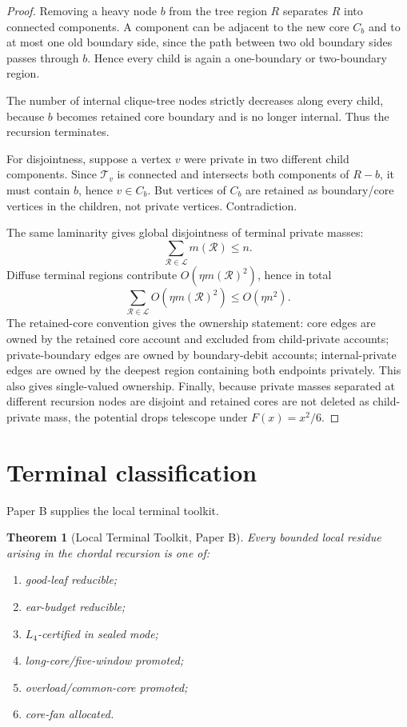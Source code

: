 \documentclass[11pt]{article}
\newtheorem{theorem}{Theorem}[section]
\theoremstyle{definition}
\newcommand{\calT}{\mathcal T}
\newcommand{\calR}{\mathcal R}
\newcommand{\calL}{\mathcal L}
\begin{document}
\begin{proof}
Removing a heavy node \(b\) from the tree region \(R\) separates \(R\) into connected components. A component can be adjacent to the new core \(C_b\) and to at most one old boundary side, since the path between two old boundary sides passes through \(b\). Hence every child is again a one-boundary or two-boundary region.

The number of internal clique-tree nodes strictly decreases along every child, because \(b\) becomes retained core boundary and is no longer internal. Thus the recursion terminates.

For disjointness, suppose a vertex \(v\) were private in two different child components. Since \(\calT_v\) is connected and intersects both components of \(R-b\), it must contain \(b\), hence \(v\in C_b\). But vertices of \(C_b\) are retained as boundary/core vertices in the children, not private vertices. Contradiction.

The same laminarity gives global disjointness of terminal private masses:
\[
    \sum_{\calR\in\calL}m(\calR)\le n.
\]
Diffuse terminal regions contribute \(O(\eta m(\calR)^2)\), hence in total
\[
    \sum_{\calR\in\calL}O(\eta m(\calR)^2)\le O(\eta n^2).
\]
The retained-core convention gives the ownership statement: core edges are owned by the retained core account and excluded from child-private accounts; private-boundary edges are owned by boundary-debit accounts; internal-private edges are owned by the deepest region containing both endpoints privately. This also gives single-valued ownership. Finally, because private masses separated at different recursion nodes are disjoint and retained cores are not deleted as child-private mass, the potential drops telescope under \(F(x)=x^2/6\).
\end{proof}

\section{Terminal classification}

Paper B supplies the local terminal toolkit.

\begin{theorem}[Local Terminal Toolkit, Paper B]\label{thm:import-toolkit}
Every bounded local residue arising in the chordal recursion is one of:
\begin{enumerate}[label=(\roman*)]
    \item good-leaf reducible;
    \item ear-budget reducible;
    \item \(L_4\)-certified in sealed mode;
    \item long-core/five-window promoted;
    \item overload/common-core promoted;
    \item core-fan allocated.
\end{enumerate}
\end{theorem}
\end{document}
